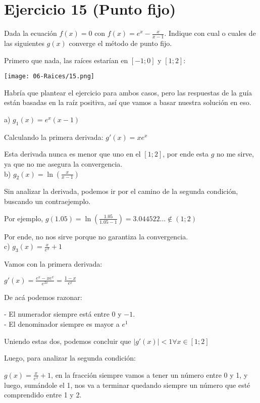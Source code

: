 \documentclass[11pt]{article}
\begin{document}
	\section{Ejercicio 15 (Punto fijo)}
	
	Dada la ecuación $f(x)=0$ con $\displaystyle f(x)=e^x-\frac{x}{x-1}$. Indique con cual o cuales de las siguientes $g(x)$ converge el método de punto fijo.
	
	Primero que nada, las raíces estarían en $[-1;0]$ y $[1;2]$:
	
	\texttt{[image: 06-Raices/15.png]}
	
	Habría que plantear el ejercicio para ambos casos, pero las respuestas de la guía están basadas en la raíz positiva, así que vamos a basar nuestra solución en eso.
	
	a) $g_1(x)=e^x(x-1)$
	
	Calculando la primera derivada: $g'(x)=xe^x$
	
	Esta derivada nunca es menor que uno en el $[1; 2]$, por ende esta $g$ no me sirve, ya que no me asegura la convergencia.\\
	
	b) $\displaystyle g_2(x)=\ln\left(\frac{x}{x-1}\right)$
	
	Sin analizar la derivada, podemos ir por el camino de la segunda condición, buscando un contraejemplo.
	
	Por ejemplo, $\displaystyle g(1.05)=\ln\left(\frac{1.05}{1.05-1}\right)=3.044522\dots \notin (1; 2)$
	
	Por ende, no nos sirve porque no garantiza la convergencia.\\
	
	c) $\displaystyle g_3(x)=\frac{x}{e^x}+1$
	
	Vamos con la primera derivada:
	
	$\displaystyle g'(x)=\frac{e^x-xe^x}{e^{2x}}=\frac{1-x}{e^x}$
	
	De acá podemos razonar:
	
	- El numerador siempre está entre $0$ y $-1$.\\
	- El denominador siempre es mayor a $e^1$
	
	Uniendo estas dos, podemos concluir que $|g'(x)|<1 \forall x \in [1;2]$
	
	Luego, para analizar la segunda condición:
	
	$\displaystyle g(x)=\frac{x}{e^x}+1$, en la fracción siempre vamos a tener un número entre 0 y 1, y luego, sumándole el 1, nos va a terminar quedando siempre un número que esté comprendido entre 1 y 2.
	
\end{document}
